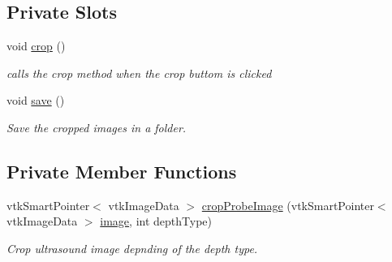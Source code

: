 \subsection*{Private Slots}
\begin{DoxyCompactItemize}
\item 
void \hyperlink{class_crop_images_widget_a8d459309b0788c1ba54bc4fb9af23b4f}{crop} ()
\begin{DoxyCompactList}\small\item\em calls the crop method when the crop buttom is clicked \end{DoxyCompactList}\item 
void \hyperlink{class_crop_images_widget_aa460a3fff6b20304c5629d6ed0cb8bed}{save} ()
\begin{DoxyCompactList}\small\item\em Save the cropped images in a folder. \end{DoxyCompactList}\end{DoxyCompactItemize}
\subsection*{Private Member Functions}
\begin{DoxyCompactItemize}
\item 
vtk\-Smart\-Pointer$<$ vtk\-Image\-Data $>$ \hyperlink{class_crop_images_widget_a2e6cc0f4bf2954d17ccc126e08648f48}{crop\-Probe\-Image} (vtk\-Smart\-Pointer$<$ vtk\-Image\-Data $>$ \hyperlink{class_crop_images_widget_ab160815d191ed30e0c6b8a905818ab3b}{image}, int depth\-Type)
\begin{DoxyCompactList}\small\item\em Crop ultrasound image depnding of the depth type. \end{DoxyCompactList}\end{DoxyCompactItemize}
